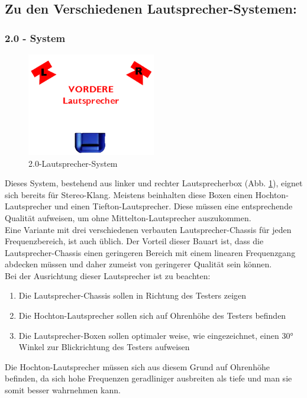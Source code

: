 \newpage
\subsection*{Zu den Verschiedenen Lautsprecher-Systemen:}
\subsubsection*{2.0 - System}
\begin{figure} [H]
	\centering
	\includegraphics[width=0.5\textwidth]{img/Grundlagen/Mehrweg-Lautsprechersysteme/DOLBYDigital20-cut.jpg}
	\caption{2.0-Lautsprecher-System}
	\label{fig:3.2.3}
\end{figure}

Dieses System, bestehend aus linker und rechter Lautsprecherbox (Abb. \ref{fig:3.2.3}), eignet sich bereits für Stereo-Klang.
Meistens beinhalten diese Boxen einen Hochton-Lautsprecher und einen Tiefton-Lautsprecher.
Diese müssen eine entsprechende Qualität aufweisen, um ohne Mittelton-Lautsprecher auszukommen.\\
Eine Variante mit drei verschiedenen verbauten Lautsprecher-Chassis für jeden Frequenzbereich, ist auch üblich.
Der Vorteil dieser Bauart ist, dass die Lautsprecher-Chassis einen geringeren Bereich mit einem linearen Frequenzgang abdecken müssen und daher zumeist von geringerer Qualität sein können.\\
Bei der Ausrichtung dieser Lautsprecher ist zu beachten:
\begin{enumerate}
	\item Die Lautsprecher-Chassis sollen in Richtung des Testers zeigen
	\item Die Hochton-Lautsprecher sollen sich auf Ohrenhöhe des Testers befinden
	\item Die Lautsprecher-Boxen sollen optimaler weise, wie eingezeichnet, einen 30° Winkel zur Blickrichtung des Testers aufweisen
\end{enumerate}
Die Hochton-Lautsprecher müssen sich aus diesem Grund auf Ohrenhöhe befinden, da sich hohe Frequenzen geradliniger ausbreiten als tiefe und man sie somit besser wahrnehmen kann.


